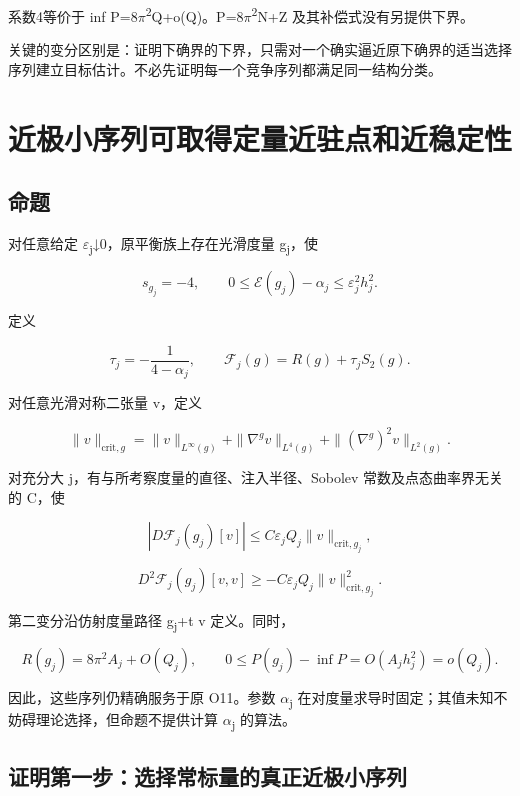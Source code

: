 \documentclass[UTF8,11pt,openany,oneside,fontset=none]{ctexbook}
\begin{document}
系数4等价于 inf P=8\(\pi\)\textsuperscript{2}Q+o(Q)。P=8\(\pi\)\textsuperscript{2}N+Z 及其补偿式没有另提供下界。

关键的变分区别是：证明下确界的下界，只需对一个确实逼近原下确界的适当选择序列建立目标估计。不必先证明每一个竞争序列都满足同一结构分类。

\section{近极小序列可取得定量近驻点和近稳定性}\label{ch1:ux8fd1ux6781ux5c0fux5e8fux5217ux53efux53d6ux5f97ux5b9aux91cfux8fd1ux9a7bux70b9ux548cux8fd1ux7a33ux5b9aux6027}

\subsection{命题}\label{ch1:ux547dux9898-1}

对任意给定 \(\varepsilon\)\textsubscript{j}↓0，原平衡族上存在光滑度量 g\textsubscript{j}，使

\[
s_{g_j}=-4,\qquad
0\le\mathcal E(g_j)-\alpha_j\le\varepsilon_j^2 h_j^2.
\tag{1.7}\label{eq:r1:7}
\]

定义

\[
\tau_j=-\frac1{4-\alpha_j},\qquad
\mathscr F_j(g)=R(g)+\tau_jS_2(g).
\tag{1.8}\label{eq:r1:8}
\]

对任意光滑对称二张量 v，定义

\[
\|v\|_{\mathrm{crit},g}
=\|v\|_{L^\infty(g)}
+\|\nabla^g v\|_{L^4(g)}
+\|(\nabla^g)^2v\|_{L^2(g)}.
\tag{1.9}\label{eq:r1:9}
\]

对充分大 j，有与所考察度量的直径、注入半径、Sobolev 常数及点态曲率界无关的 C，使

\[
\boxed{|D\mathscr F_j(g_j)[v]|
\le C\varepsilon_jQ_j\|v\|_{\mathrm{crit},g_j},}
\tag{1.10}\label{eq:r1:10}
\]

\[
\boxed{D^2\mathscr F_j(g_j)[v,v]
\ge-C\varepsilon_jQ_j\|v\|_{\mathrm{crit},g_j}^2.}
\tag{1.11}\label{eq:r1:11}
\]

第二变分沿仿射度量路径 g\textsubscript{j}+t v 定义。同时，

\[
R(g_j)=8\pi^2A_j+O(Q_j),\qquad
0\le P(g_j)-\inf P=O(A_jh_j^2)=o(Q_j).
\tag{1.12}\label{eq:r1:12}
\]

因此，这些序列仍精确服务于原 O11。参数 \(\alpha\)\textsubscript{j} 在对度量求导时固定；其值未知不妨碍理论选择，但命题不提供计算 \(\alpha\)\textsubscript{j} 的算法。

\subsection{证明第一步：选择常标量的真正近极小序列}\label{ch1:ux8bc1ux660eux7b2cux4e00ux6b65ux9009ux62e9ux5e38ux6807ux91cfux7684ux771fux6b63ux8fd1ux6781ux5c0fux5e8fux5217}
\end{document}
